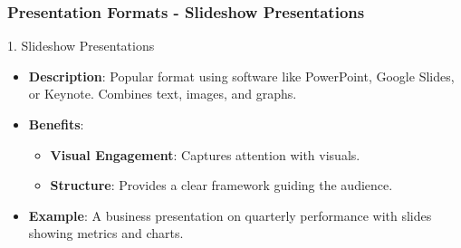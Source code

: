 \documentclass[aspectratio=169]{beamer}
\begin{document}
\begin{frame}[fragile]
    \frametitle{Presentation Formats - Slideshow Presentations}
    \begin{block}{1. Slideshow Presentations}
        \begin{itemize}
            \item \textbf{Description}: Popular format using software like PowerPoint, Google Slides, or Keynote. Combines text, images, and graphs.
            \item \textbf{Benefits}:
                \begin{itemize}
                    \item \textbf{Visual Engagement}: Captures attention with visuals.
                    \item \textbf{Structure}: Provides a clear framework guiding the audience.
                \end{itemize}
            \item \textbf{Example}: A business presentation on quarterly performance with slides showing metrics and charts.
        \end{itemize}
    \end{block}
\end{frame}
\end{document}
